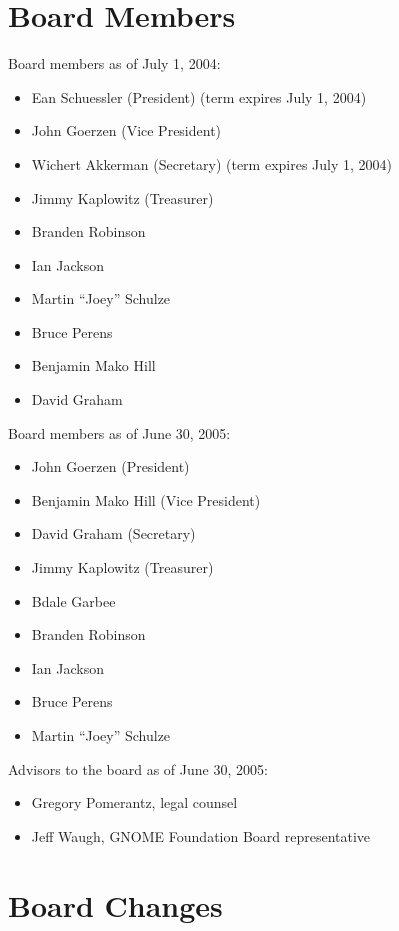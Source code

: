 \documentclass[letterpaper]{report}
\begin{document}
\section{Board Members}

Board members as of July 1, 2004:

\begin{itemize}
\item Ean Schuessler (President) (term expires July 1, 2004)
\item John Goerzen (Vice President)
\item Wichert Akkerman (Secretary) (term expires July 1, 2004)
\item Jimmy Kaplowitz (Treasurer)
\item Branden Robinson
\item Ian Jackson
\item Martin ``Joey'' Schulze
\item Bruce Perens
\item Benjamin Mako Hill
\item David Graham
\end{itemize}

Board members as of June 30, 2005:

\begin{itemize}
\item John Goerzen (President)
\item Benjamin Mako Hill (Vice President)
\item David Graham (Secretary)
\item Jimmy Kaplowitz (Treasurer)
\item Bdale Garbee
\item Branden Robinson
\item Ian Jackson
\item Bruce Perens
\item Martin ``Joey'' Schulze
\end{itemize}

Advisors to the board as of June 30, 2005:

\begin{itemize}
\item Gregory Pomerantz, legal counsel
\item Jeff Waugh, GNOME Foundation Board representative
\end{itemize}

\section{Board Changes}
\end{document}
